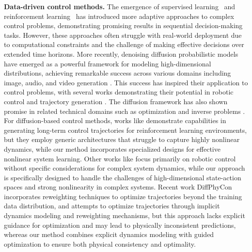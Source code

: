 \textbf{Data-driven control methods.} The emergence of supervised learning~\cite{pomerleau1988alvinn} and reinforcement learning~\cite{haarnoja2018soft,zhuang2023behavior} has introduced more adaptive approaches to complex control problems, demonstrating promising results in sequential decision-making tasks. However, these approaches often struggle with real-world deployment due to computational constraints and the challenge of making effective decisions over extended time horizons.
More recently, denoising diffusion probabilistic models \citep{ho2020denoising} have emerged as a powerful framework for modeling high-dimensional distributions, achieving remarkable success across various domains including image, audio, and video generation \citep{dhariwal2021diffusion,kong2020diffwave,ho2022video}. This success has inspired their application to control problems, with several works demonstrating their potential in robotic control \citep{janner2022planning,ajay2022conditional} and trajectory generation \citep{liang2023adaptdiffuser,zhou2024adaptive}. The diffusion framework has also shown promise in related technical domains such as optimization \citep{krishnamoorthy2023diffusion,sun2023difusco} and inverse problems \citep{chung2022diffusion}. 
For diffusion-based control methods, works like \citep{janner2022planning,ajay2022conditional} demonstrate capabilities in generating long-term control trajectories for reinforcement learning environments, but they employ generic architectures that struggle to capture highly nonlinear dynamics, while our method incorporates specialized designs for effective nonlinear system learning. Other works like \citep{liang2023adaptdiffuser,zhou2024adaptive} focus primarily on robotic control without specific considerations for complex system dynamics, while our approach is specifically designed to handle the challenges of high-dimensional state-action spaces and strong nonlinearity in complex systems. Recent work DiffPhyCon \citep{wei2024generative} incorporates reweighting techniques to optimize trajectories beyond the training data distribution, and attempts to optimize trajectories through implicit dynamics modeling and reweighting mechanisms, but this approach lacks explicit guidance for optimization and may lead to physically inconsistent predictions, whereas our method combines explicit dynamics modeling with guided optimization to ensure both physical consistency and optimality. 


